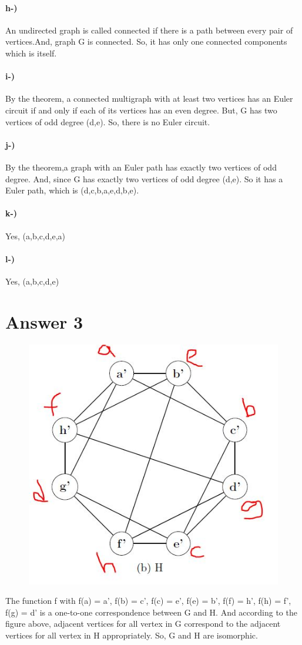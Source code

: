 \documentclass[12pt]{article}
\begin{document}
\paragraph{h-)}
An undirected graph is called  connected if there is a path between every pair of vertices.And, graph G is connected. So, it has only one connected components which is itself.
\paragraph{i-)}
By the theorem, a connected multigraph with at least two vertices has an Euler circuit if and only if each of its vertices has an even degree. But, G has two vertices of odd degree (d,e). So, there is no Euler circuit.
\paragraph{j-)}
By the theorem,a graph with an Euler path has exactly two vertices of odd degree. And, since G has exactly two vertices of odd degree (d,e). So it has a Euler path, which is (d,c,b,a,e,d,b,e).  
\paragraph{k-)}
Yes, (a,b,c,d,e,a)
\paragraph{l-)}
Yes, (a,b,c,d,e)
\section*{Answer 3}
\begin{figure}[h]
    \begin{center}
        \includegraphics[width=.4\textwidth]{Capture.JPG}
    \end{center}
    \label{my_fig}
\end{figure}
The function f with f(a) = a', f(b) = c', f(c) = e', f(e) = b', f(f) = h', f(h) = f', f(g) = d' is a one-to-one correspondence between G and H. And according to the figure above, adjacent vertices for all vertex in G correspond to the adjacent vertices for all vertex in H appropriately. So, G and H are isomorphic.
\end{document}
